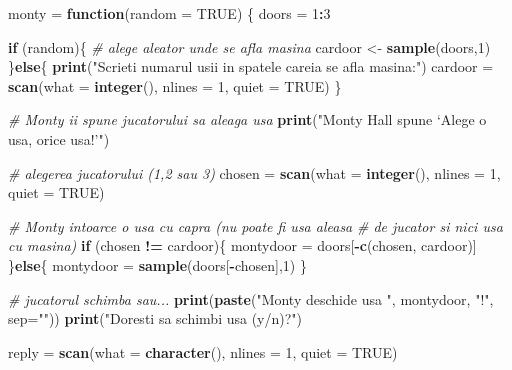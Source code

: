 \documentclass[]{article}
\newenvironment{Shaded}{\begin{snugshade}}{\end{snugshade}}
\newcommand{\KeywordTok}[1]{\textcolor[rgb]{0.13,0.29,0.53}{\textbf{#1}}}
\newcommand{\DataTypeTok}[1]{\textcolor[rgb]{0.13,0.29,0.53}{#1}}
\newcommand{\DecValTok}[1]{\textcolor[rgb]{0.00,0.00,0.81}{#1}}
\newcommand{\StringTok}[1]{\textcolor[rgb]{0.31,0.60,0.02}{#1}}
\newcommand{\CommentTok}[1]{\textcolor[rgb]{0.56,0.35,0.01}{\textit{#1}}}
\newcommand{\OtherTok}[1]{\textcolor[rgb]{0.56,0.35,0.01}{#1}}
\newcommand{\ControlFlowTok}[1]{\textcolor[rgb]{0.13,0.29,0.53}{\textbf{#1}}}
\newcommand{\OperatorTok}[1]{\textcolor[rgb]{0.81,0.36,0.00}{\textbf{#1}}}
\newcommand{\NormalTok}[1]{#1}
\begin{document}
\begin{Shaded}
\begin{Highlighting}[]
\NormalTok{monty =}\StringTok{ }\ControlFlowTok{function}\NormalTok{(}\DataTypeTok{random =} \OtherTok{TRUE}\NormalTok{) \{}
\NormalTok{  doors =}\StringTok{ }\DecValTok{1}\OperatorTok{:}\DecValTok{3}
  
  \ControlFlowTok{if}\NormalTok{ (random)\{}
    \CommentTok{# alege aleator unde se afla masina}
\NormalTok{    cardoor <-}\StringTok{ }\KeywordTok{sample}\NormalTok{(doors,}\DecValTok{1}\NormalTok{)}
\NormalTok{  \}}\ControlFlowTok{else}\NormalTok{\{}
    \KeywordTok{print}\NormalTok{(}\StringTok{"Scrieti numarul usii in spatele careia se afla masina:"}\NormalTok{)}
\NormalTok{    cardoor =}\StringTok{ }\KeywordTok{scan}\NormalTok{(}\DataTypeTok{what =} \KeywordTok{integer}\NormalTok{(), }\DataTypeTok{nlines =} \DecValTok{1}\NormalTok{, }\DataTypeTok{quiet =} \OtherTok{TRUE}\NormalTok{)}
\NormalTok{  \}}
  
  \CommentTok{# Monty ii spune jucatorului sa aleaga usa }
  \KeywordTok{print}\NormalTok{(}\StringTok{"Monty Hall spune ‘Alege o usa, orice usa!’"}\NormalTok{)}
  
  \CommentTok{# alegerea jucatorului (1,2 sau 3)}
\NormalTok{  chosen =}\StringTok{ }\KeywordTok{scan}\NormalTok{(}\DataTypeTok{what =} \KeywordTok{integer}\NormalTok{(), }\DataTypeTok{nlines =} \DecValTok{1}\NormalTok{, }\DataTypeTok{quiet =} \OtherTok{TRUE}\NormalTok{)}
  
  \CommentTok{# Monty intoarce o usa cu capra (nu poate fi usa aleasa }
  \CommentTok{# de jucator si nici usa cu masina)}
  \ControlFlowTok{if}\NormalTok{ (chosen }\OperatorTok{!=}\StringTok{ }\NormalTok{cardoor)\{}
\NormalTok{     montydoor =}\StringTok{ }\NormalTok{doors[}\OperatorTok{-}\KeywordTok{c}\NormalTok{(chosen, cardoor)]}
\NormalTok{  \}}\ControlFlowTok{else}\NormalTok{\{}
\NormalTok{    montydoor =}\StringTok{ }\KeywordTok{sample}\NormalTok{(doors[}\OperatorTok{-}\NormalTok{chosen],}\DecValTok{1}\NormalTok{)}
\NormalTok{  \} }
  
  \CommentTok{# jucatorul schimba sau...}
  \KeywordTok{print}\NormalTok{(}\KeywordTok{paste}\NormalTok{(}\StringTok{"Monty deschide usa "}\NormalTok{, montydoor, }\StringTok{"!"}\NormalTok{, }\DataTypeTok{sep=}\StringTok{""}\NormalTok{))}
  \KeywordTok{print}\NormalTok{(}\StringTok{"Doresti sa schimbi usa (y/n)?"}\NormalTok{)}
  
\NormalTok{  reply =}\StringTok{ }\KeywordTok{scan}\NormalTok{(}\DataTypeTok{what =} \KeywordTok{character}\NormalTok{(), }\DataTypeTok{nlines =} \DecValTok{1}\NormalTok{, }\DataTypeTok{quiet =} \OtherTok{TRUE}\NormalTok{)}
  

\end{Highlighting}
\end{Shaded}
\end{document}
